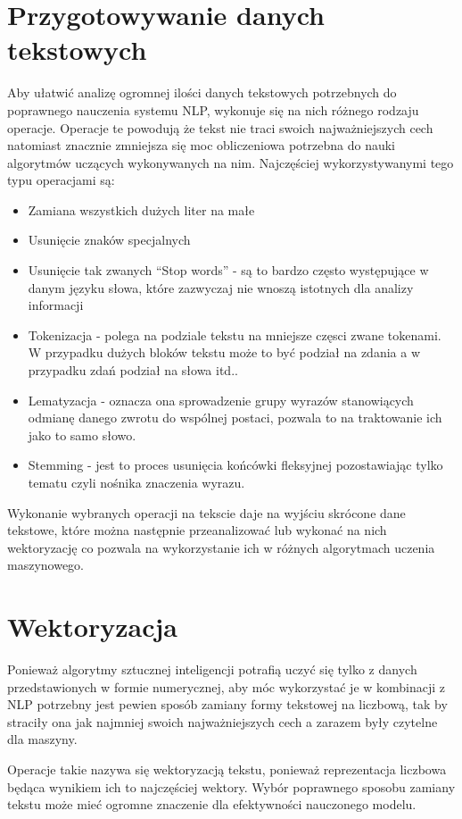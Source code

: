 \section{Przygotowywanie danych tekstowych}
Aby ułatwić analizę ogromnej ilości danych tekstowych potrzebnych do poprawnego nauczenia systemu NLP,
wykonuje się na nich różnego rodzaju operacje. Operacje te powodują że tekst nie traci swoich najważniejszych cech 
natomiast znacznie zmniejsza się moc obliczeniowa potrzebna do nauki algorytmów uczących wykonywanych na nim. 
Najczęściej wykorzystywanymi tego typu operacjami są: 
\begin{itemize}
    \item Zamiana wszystkich dużych liter na małe
    \item Usunięcie znaków specjalnych  
    \item Usunięcie tak zwanych ``Stop words'' - są to bardzo często występujące w danym języku słowa, które 
    zazwyczaj nie wnoszą istotnych dla analizy informacji
    \item Tokenizacja - polega na podziale tekstu na mniejsze częsci zwane tokenami. W przypadku dużych bloków 
    tekstu może to być podział na zdania a w przypadku zdań podział na słowa itd..
    \item Lematyzacja - oznacza ona sprowadzenie grupy wyrazów stanowiących odmianę danego zwrotu do wspólnej postaci,
    pozwala to na traktowanie ich jako to samo słowo.
    \item Stemming - jest to proces usunięcia końcówki fleksyjnej pozostawiając tylko tematu czyli nośnika znaczenia 
    wyrazu.
\end{itemize}
Wykonanie wybranych operacji na tekscie daje na wyjściu skrócone dane tekstowe, które można następnie przeanalizować lub 
wykonać na nich wektoryzację co pozwala na wykorzystanie ich w różnych algorytmach uczenia maszynowego. 
\section{Wektoryzacja}
Ponieważ algorytmy sztucznej inteligencji potrafią uczyć się tylko z danych przedstawionych w formie numerycznej, aby móc 
wykorzystać je w kombinacji z NLP potrzebny jest pewien sposób zamiany formy tekstowej na liczbową, tak by straciły ona jak najmniej
swoich najważniejszych cech a zarazem były czytelne dla maszyny. 

Operacje takie nazywa się wektoryzacją tekstu, ponieważ 
reprezentacja liczbowa będąca wynikiem ich to najczęściej wektory. 
Wybór poprawnego sposobu zamiany tekstu może mieć ogromne znaczenie dla efektywności nauczonego modelu.

